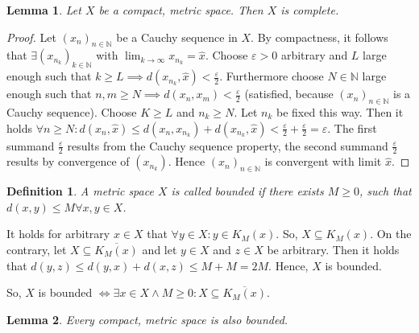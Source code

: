 \documentclass{article}
\newtheorem{definition}{Definition}  \numberwithin{definition}{section}
\newtheorem{lemma}{Lemma}  \numberwithin{lemma}{section}
\begin{document}
\begin{lemma} %
  Let $X$ be a compact, metric space. Then $X$ is complete.
\end{lemma}
\begin{proof}
  Let $(x_n)_{n\in\mathbb N}$ be a Cauchy sequence in $X$. By compactness, it follows that
  $\exists (x_{n_k})_{k \in \mathbb N}$ with $\lim_{k\to\infty} x_{n_k} = \hat{x}$.
  Choose $\varepsilon > 0$ arbitrary and $L$ large enough such that $k \geq L \implies d(x_{n_k}, \hat{x}) < \frac\varepsilon2$. Furthermore choose $N \in \mathbb N$ large enough such that $n,m \geq N \implies d(x_n, x_m) < \frac\varepsilon2$ (satisfied, because $(x_n)_{n \in \mathbb N}$ is a Cauchy sequence).
  Choose $K \geq L$ and $n_k \geq N$. Let $n_k$ be fixed this way.
  Then it holds $\forall n \geq N: d(x_n, \hat{x}) \leq d(x_n, x_{n_k}) + d(x_{n_k}, \hat{x}) < \frac\varepsilon2 + \frac\varepsilon2 = \varepsilon$. The first summand $\frac\varepsilon2$ results from the Cauchy sequence property, the second summand $\frac\varepsilon2$ results by convergence of $(x_{n_k})$. Hence $(x_n)_{n\in\mathbb N}$ is convergent with limit $\hat{x}$.
\end{proof}

\begin{definition} %
  A metric space $X$ is called \emph{bounded} if there exists $M \geq 0$, such that $d(x,y) \leq M \forall x,y \in X$.
\end{definition}
It holds for arbitrary $x \in X$ that $\forall y \in X: y \in K_M(x)$.
So, $X \subseteq K_M(x)$.
On the contrary, let $X \subseteq \overline{K_M(x)}$ and let $y \in X$ and $z \in X$ be arbitrary. Then it holds that $d(y, z) \leq d(y, x) + d(x, z) \leq M + M = 2M$. Hence, $X$ is bounded.

So, $X$ is bounded $\iff \exists x \in X \land M \geq 0: X \subseteq \overline{K_M(x)}$.

\begin{lemma} %
  Every compact, metric space is also bounded.
\end{lemma}
\end{document}
